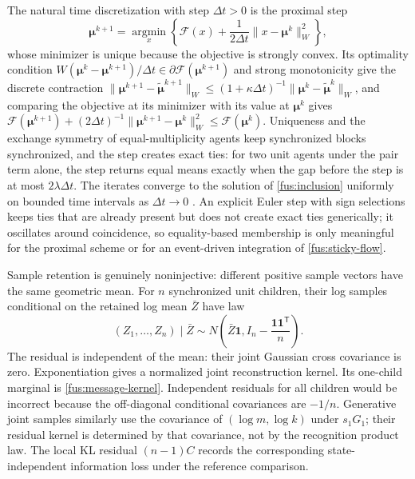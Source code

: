 The natural time discretization with step $\Delta t>0$ is the proximal step
\begin{equation}
 \boldsymbol\mu^{k+1}=\operatorname*{argmin}_{x}
 \left\{\mathcal F(x)+\frac1{2\Delta t}\|x-\boldsymbol\mu^k\|_W^2\right\},
 \label{fus:prox-step}
\end{equation}
whose minimizer is unique because the objective is strongly convex. Its
optimality condition
$W(\boldsymbol\mu^k-\boldsymbol\mu^{k+1})/\Delta t\in\partial\mathcal F(\boldsymbol\mu^{k+1})$
and strong monotonicity give the discrete contraction
$\|\boldsymbol\mu^{k+1}-\widetilde{\boldsymbol\mu}^{k+1}\|_W\leq
(1+\kappa\Delta t)^{-1}\|\boldsymbol\mu^k-\widetilde{\boldsymbol\mu}^k\|_W$,
and comparing the objective at its minimizer with its value at
$\boldsymbol\mu^k$ gives
$\mathcal F(\boldsymbol\mu^{k+1})+(2\Delta t)^{-1}\|\boldsymbol\mu^{k+1}-\boldsymbol\mu^k\|_W^2
\leq\mathcal F(\boldsymbol\mu^k)$. Uniqueness and the exchange symmetry of
equal-multiplicity agents keep synchronized blocks synchronized, and the
step creates exact ties: for two unit agents under the pair term alone, the
step returns equal means exactly when the gap before the step is at most
$2\lambda\Delta t$. The iterates converge to the solution of
\cref{fus:inclusion} uniformly on bounded time intervals as $\Delta t\to0$
\cite{CrandallLiggett1971}. An explicit Euler step with sign selections
keeps ties that are already present but does not create exact ties
generically; it oscillates around coincidence, so equality-based membership
is only meaningful for the proximal scheme or for an event-driven
integration of \cref{fus:sticky-flow}.

Sample retention is genuinely noninjective: different positive sample
vectors have the same geometric mean. For $n$ synchronized unit children,
their log samples conditional on the retained log mean $\bar Z$ have law
\begin{equation}
 (Z_1,\ldots,Z_n)\mid\bar Z
 \sim N\left(\bar Z\mathbf1,
 I_n-\frac{\mathbf1\mathbf1^{\mathsf T}}n\right).
 \label{fus:reconstruction}
\end{equation}
The residual is independent of the mean: their joint Gaussian cross
covariance is zero. Exponentiation gives a normalized joint reconstruction
kernel. Its one-child marginal is \cref{fus:message-kernel}. Independent
residuals for all children would be incorrect because the off-diagonal
conditional covariances are $-1/n$. Generative joint samples similarly use
the covariance of $(\log m,\log k)$ under $s_1G_1$; their
residual kernel is determined by that covariance, not by the recognition
product law. The local KL residual $(n-1)C$ records the corresponding
state-independent information loss under the reference comparison.

